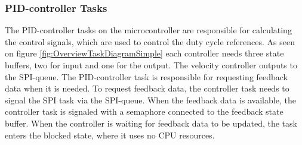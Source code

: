 \documentclass[../../main.tex]{subfiles}
\begin{document}
\subsubsection*{PID-controller Tasks}
The PID-controller tasks on the microcontroller are responsible for calculating the control signals, which are used to control the duty cycle references. As seen on figure \ref{fig:OverviewTaskDiagramSimple} each controller needs three state buffers, two for input and one for the output. The velocity controller outputs to the SPI-queue. The PID-controller task is responsible for requesting feedback data when it is needed. To request feedback data, the controller task needs to signal the SPI task via the SPI-queue. When the feedback data is available, the controller task is signaled with a semaphore connected to the feedback state buffer. When the controller is waiting for feedback data to be updated, the task enters the blocked state, where it uses no CPU resources. 



\end{document}
